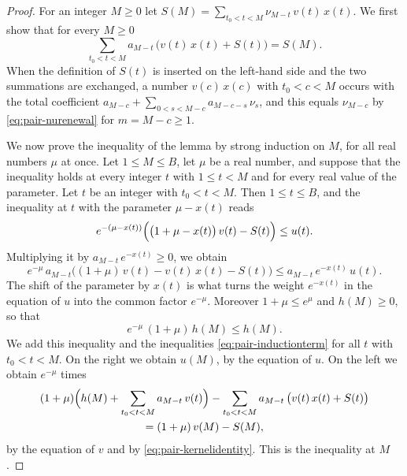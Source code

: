 \documentclass{amsart}
\theoremstyle{definition}
\theoremstyle{remark}
\numberwithin{equation}{section}
\begin{document}
\begin{proof}
For an integer $M\ge0$ let $S(M)=\sum_{t_0<t<M}\nu_{M-t}\,v(t)\,x(t)$. We
first show that for every $M\ge0$
\begin{equation}\label{eq:pair-kernelidentity}
\sum_{t_0<t<M}a_{M-t}\,\bigl(v(t)\,x(t)+S(t)\bigr)=S(M).
\end{equation}
When the definition of $S(t)$ is inserted on the left-hand side and the two
summations are exchanged, a number $v(c)\,x(c)$ with $t_0<c<M$ occurs with
the total coefficient $a_{M-c}+\sum_{0<s<M-c}a_{M-c-s}\,\nu_s$, and this
equals $\nu_{M-c}$ by \eqref{eq:pair-nurenewal} for $m=M-c\ge1$.

We now prove the inequality of the lemma by strong induction on $M$, for all
real numbers $\mu$ at once. Let $1\le M\le B$, let $\mu$ be a real number,
and suppose that the inequality holds at every integer $t$ with $1\le t<M$
and for every real value of the parameter. Let $t$ be an integer with
$t_0<t<M$. Then $1\le t\le B$, and the inequality at $t$ with the parameter
$\mu-x(t)$ reads
\[
e^{-(\mu-x(t))}\Bigl(\bigl(1+\mu-x(t)\bigr)\,v(t)-S(t)\Bigr)\le u(t).
\]
Multiplying it by $a_{M-t}\,e^{-x(t)}\ge0$, we obtain
\begin{equation}\label{eq:pair-inductionterm}
e^{-\mu}\,a_{M-t}\bigl((1+\mu)\,v(t)-v(t)\,x(t)-S(t)\bigr)
\le a_{M-t}\,e^{-x(t)}\,u(t).
\end{equation}
The shift of the parameter by $x(t)$ is what turns the weight $e^{-x(t)}$ in
the equation of $u$ into the common factor $e^{-\mu}$. Moreover
$1+\mu\le e^{\mu}$ and $h(M)\ge0$, so that
\[
e^{-\mu}\,(1+\mu)\,h(M)\le h(M).
\]
We add this inequality and the inequalities \eqref{eq:pair-inductionterm}
for all $t$ with $t_0<t<M$. On the right we obtain $u(M)$, by the equation of
$u$. On the left we obtain $e^{-\mu}$ times
\begin{multline*}
(1+\mu)\Bigl(h(M)+\sum_{t_0<t<M}a_{M-t}\,v(t)\Bigr)
-\sum_{t_0<t<M}a_{M-t}\,\bigl(v(t)\,x(t)+S(t)\bigr)\\
=(1+\mu)\,v(M)-S(M),
\end{multline*}
by the equation of $v$ and by \eqref{eq:pair-kernelidentity}. This is the
inequality at $M$.
\end{proof}
\end{document}
